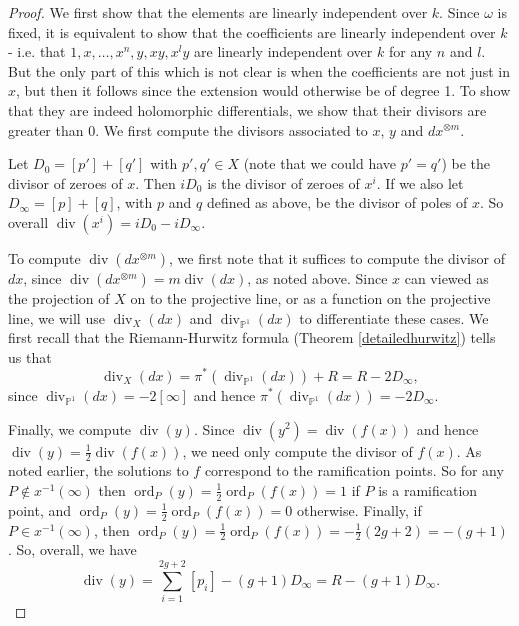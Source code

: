 \documentclass[draft, 11pt]{article} %
\theoremstyle{plain}
\theoremstyle{remark}
\newcommand{\cL}{{\mathcal L}}
\DeclareMathOperator{\ord}{ord}
\DeclareMathOperator{\di}{div}
\begin{document}
\begin{proof}
We first show that the elements are linearly independent over $k$.
Since $\omega$ is fixed, it is equivalent to show that the coefficients are linearly independent over $k$ - i.e. that $1,x,\ldots ,x^n, y, xy, x^ly$ are linearly independent over $k$ for any $n$ and $l$.
But the only part of this which is not clear is when the coefficients are not just in $x$, but then it follows since the extension would otherwise be of degree 1.
To show that they are indeed holomorphic differentials, we show that their divisors are greater than $0$.
We first compute the divisors associated to $x$, $y$ and $dx^{\otimes m}$.
\begin{comment}
For any $f\in K(X)$ we will denote by $(f)_0$ and $(f)_\infty$ the divisor of zeroes and divisor of poles of $f$ respectively.
In particular, 
\[
          (f)_0 := \sum_{\{P\in X|\ord_P(f)>0\}}\ord_P(f)[P],      
 \]
 and 
 \[
 (f)_\infty = \sum_{\{P\in X |\ord_P(f)<0\}} -\ord_P(f)[P].
 \]
\end{comment}

Let $D_0 = [p']+[q']$ with $p',q' \in X$ (note that we could have $p' = q'$) be the divisor of zeroes of $x$. 
Then $ i D_0$ is the divisor of zeroes of $x^i$. 
If we also let $D_\infty = [p] + [q]$, with $p$ and $q$ defined as above, be the divisor of poles of $x$. 
So overall $\di (x^i) = i D_0 - i D_\infty$.


To compute $\di (dx^{\otimes m})$, we first note that it suffices to compute the divisor of $dx$, since $\di (dx^{\otimes m}) =m\di (dx)$, as noted above.
Since $x$ can viewed as the projection of $X$ on to the projective line, or as a function on the projective line, we will use $\di_X (dx)$ and $\di_{\mathbb P^1} (dx)$ to differentiate these cases.
We first recall that the Riemann-Hurwitz formula (Theorem \ref{detailedhurwitz}) tells us that
\[
 \di_X (dx) = \pi^*( \di_{\mathbb P^1}(dx)) + R = R - 2D_{\infty},
\]
since $\di_{\mathbb P^1}(dx) = -2[\infty]$ and hence $\pi^* (\di_{\mathbb P^1}(dx)) = -2D_\infty$.

Finally, we compute $\di (y)$.
Since $\di (y^2) = \di (f(x))$ and hence $\di(y) = \frac{1}{2}\di(f(x))$, we need only compute the divisor of $f(x)$.
As noted earlier, the solutions to $f$ correspond to the ramification points.
So for any $P\notin x^{-1}(\infty)$ then $\ord_P(y) =  \frac{1}{2}\ord_P(f(x)) = 1$ if $P$ is a ramification point, and $\ord_P(y) = \frac{1}{2}\ord_P(f(x)) = 0$ otherwise.
Finally, if $P\in x^{-1}(\infty)$, then $\ord_P(y)  = \frac{1}{2}\ord_P(f(x)) = - \frac{1}{2} (2g+2) = -(g+1)$.
So, overall, we have 
\[
 \di(y) = \sum_{i=1}^{2g+2} [p_i]- (g+1)D_\infty = R - (g+1)D_{\infty}.
 \]
\begin{comment}
Firstly, since $y(p_i)= y(j(p_i)) = j^*(y)(p_i)= -y(p_i)$ for all $i$ we see that $y(p_i)=0$.
Therefore $\deg(y)_0 \geq \deg\left(\sum_{i = 1}^{2g +2} [p_i] \right) = 2g+2$.
But since $y\in \cL(D)$, we know that $\deg(y)_{\infty} \leq \deg((g+1)D) = 2g + 2$, and as $\deg(y) = \deg(y)_0 - \deg(y)_{\infty} = 0$ then $\deg(y)_0 = \deg(y)_{\infty} = 2g+2$.
So
\[
 (y)_0 = \sum_{i=1}^{2g+2} [p_i], \ (y)_{\infty} = (g+1)D_\infty.
\]
\end{comment}


\end{proof}
\end{document}
